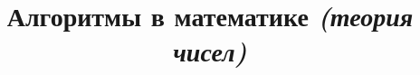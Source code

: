 



\title{Алгоритмы в математике \textit{(теория чисел)}}
\maketitle

\tableofcontents

















